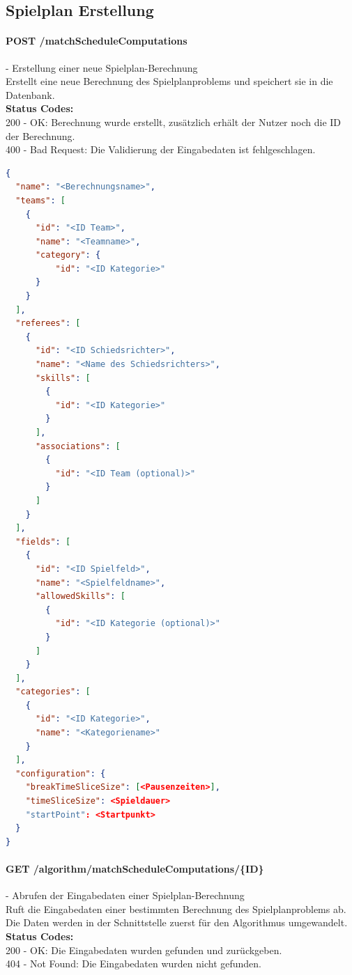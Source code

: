 %
%
%
%

\subsection{Spielplan Erstellung}

\paragraph{POST /matchScheduleComputations} - Erstellung einer neue Spielplan-Berechnung\mbox{}\\
Erstellt eine neue Berechnung des Spielplanproblems und speichert sie in die Datenbank.\\
\textbf{Status Codes:}\\
200 - OK: Berechnung wurde erstellt, zusätzlich erhält der Nutzer noch die ID der Berechnung.\\
400 - Bad Request: Die Validierung der Eingabedaten ist fehlgeschlagen.\\

\begin{lstlisting}[language=JSON, caption=Beispiel einer Eingabe für das Spielplanproblem, label=lst:input_matchScheduling]  
{
  "name": "<Berechnungsname>",
  "teams": [
    {
      "id": "<ID Team>",
      "name": "<Teamname>",
      "category": {
          "id": "<ID Kategorie>"
      }
    }
  ],
  "referees": [
    {
      "id": "<ID Schiedsrichter>",
      "name": "<Name des Schiedsrichters>",
      "skills": [
        {
          "id": "<ID Kategorie>"
        }
      ],
      "associations": [
        {
          "id": "<ID Team (optional)>"
        }
      ]
    }
  ],
  "fields": [
    {
      "id": "<ID Spielfeld>",
      "name": "<Spielfeldname>",
      "allowedSkills": [
        {
          "id": "<ID Kategorie (optional)>"
        }
      ]
    }
  ],
  "categories": [
    {
      "id": "<ID Kategorie>",
      "name": "<Kategoriename>"
    }
  ],
  "configuration": {
    "breakTimeSliceSize": [<Pausenzeiten>],
    "timeSliceSize": <Spieldauer>
    "startPoint": <Startpunkt>
  }
}
\end{lstlisting}

\paragraph{GET /algorithm/matchScheduleComputations/\{ID\}} - Abrufen der Eingabedaten einer Spielplan-Berechnung\mbox{}\\
Ruft die Eingabedaten einer bestimmten Berechnung des Spielplanproblems ab. Die Daten werden in der Schnittstelle zuerst für den Algorithmus umgewandelt.\\
\textbf{Status Codes:}\\
200 - OK: Die Eingabedaten wurden gefunden und zurückgeben.\\
404 - Not Found: Die Eingabedaten wurden nicht gefunden.\\

